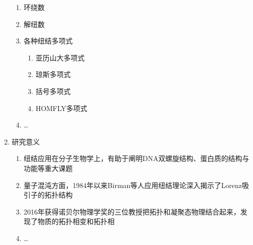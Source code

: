 \documentclass[bigger]{beamer}
\begin{document}
\begin{enumerate}
\begin{enumerate}
\item 环绕数
\label{sec:orgd04c7ad}
\item 解纽数
\label{sec:org6d8a0c6}
\item 各种纽结多项式
\label{sec:org9aa9916}
\begin{enumerate}
\item 亚历山大多项式
\label{sec:org3feb0a4}
\item 琼斯多项式
\label{sec:org86a4256}
\item 括号多项式
\label{sec:org1965155}
\item HOMFLY多项式
\label{sec:org2da47d5}
\end{enumerate}
\item \ldots{}
\label{sec:orge2ba385}
\end{enumerate}
\item 研究意义
\label{sec:orgfa553d0}
\begin{enumerate}
\item 纽结应用在分子生物学上，有助于阐明DNA双螺旋结构、蛋白质的结构与功能等重大课题
\label{sec:org175ac08}
\item 量子混沌方面，1984年以来Birman等人应用纽结理论深入揭示了Lorenz吸引子的拓扑结构
\label{sec:org4f54aa4}
\item 2016年获得诺贝尔物理学奖的三位教授把拓扑和凝聚态物理结合起来，发现了物质的拓扑相变和拓扑相
\label{sec:orgfeeeee1}
\item \ldots{}
\label{sec:org9fda940}
\end{enumerate}
\end{enumerate}
\end{document}

